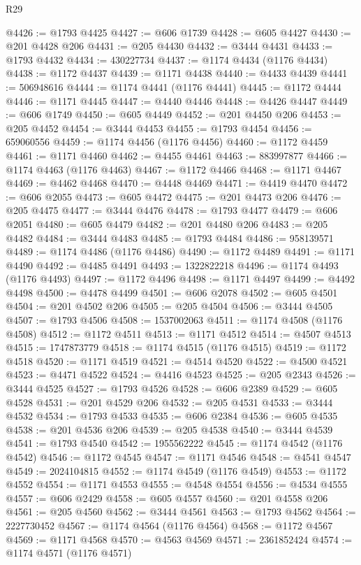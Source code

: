 \begin{lexlean}{R29}
\begin{coremodule}
@4426 := @1793 @4425
@4427 := @606 @1739
@4428 := @605 @4427
@4430 := @201 @4428 @206
@4431 := @205 @4430
@4432 := @3444 @4431
@4433 := @1793 @4432
@4434 := 430227734
@4437 := @1174 @4434 (@1176 @4434)
@4438 := @1172 @4437
@4439 := @1171 @4438
@4440 := @4433 @4439
@4441 := 506948616
@4444 := @1174 @4441 (@1176 @4441)
@4445 := @1172 @4444
@4446 := @1171 @4445
@4447 := @4440 @4446
@4448 := @4426 @4447
@4449 := @606 @1749
@4450 := @605 @4449
@4452 := @201 @4450 @206
@4453 := @205 @4452
@4454 := @3444 @4453
@4455 := @1793 @4454
@4456 := 659060556
@4459 := @1174 @4456 (@1176 @4456)
@4460 := @1172 @4459
@4461 := @1171 @4460
@4462 := @4455 @4461
@4463 := 883997877
@4466 := @1174 @4463 (@1176 @4463)
@4467 := @1172 @4466
@4468 := @1171 @4467
@4469 := @4462 @4468
@4470 := @4448 @4469
@4471 := @4419 @4470
@4472 := @606 @2055
@4473 := @605 @4472
@4475 := @201 @4473 @206
@4476 := @205 @4475
@4477 := @3444 @4476
@4478 := @1793 @4477
@4479 := @606 @2051
@4480 := @605 @4479
@4482 := @201 @4480 @206
@4483 := @205 @4482
@4484 := @3444 @4483
@4485 := @1793 @4484
@4486 := 958139571
@4489 := @1174 @4486 (@1176 @4486)
@4490 := @1172 @4489
@4491 := @1171 @4490
@4492 := @4485 @4491
@4493 := 1322822218
@4496 := @1174 @4493 (@1176 @4493)
@4497 := @1172 @4496
@4498 := @1171 @4497
@4499 := @4492 @4498
@4500 := @4478 @4499
@4501 := @606 @2078
@4502 := @605 @4501
@4504 := @201 @4502 @206
@4505 := @205 @4504
@4506 := @3444 @4505
@4507 := @1793 @4506
@4508 := 1537002063
@4511 := @1174 @4508 (@1176 @4508)
@4512 := @1172 @4511
@4513 := @1171 @4512
@4514 := @4507 @4513
@4515 := 1747873779
@4518 := @1174 @4515 (@1176 @4515)
@4519 := @1172 @4518
@4520 := @1171 @4519
@4521 := @4514 @4520
@4522 := @4500 @4521
@4523 := @4471 @4522
@4524 := @4416 @4523
@4525 := @205 @2343
@4526 := @3444 @4525
@4527 := @1793 @4526
@4528 := @606 @2389
@4529 := @605 @4528
@4531 := @201 @4529 @206
@4532 := @205 @4531
@4533 := @3444 @4532
@4534 := @1793 @4533
@4535 := @606 @2384
@4536 := @605 @4535
@4538 := @201 @4536 @206
@4539 := @205 @4538
@4540 := @3444 @4539
@4541 := @1793 @4540
@4542 := 1955562222
@4545 := @1174 @4542 (@1176 @4542)
@4546 := @1172 @4545
@4547 := @1171 @4546
@4548 := @4541 @4547
@4549 := 2024104815
@4552 := @1174 @4549 (@1176 @4549)
@4553 := @1172 @4552
@4554 := @1171 @4553
@4555 := @4548 @4554
@4556 := @4534 @4555
@4557 := @606 @2429
@4558 := @605 @4557
@4560 := @201 @4558 @206
@4561 := @205 @4560
@4562 := @3444 @4561
@4563 := @1793 @4562
@4564 := 2227730452
@4567 := @1174 @4564 (@1176 @4564)
@4568 := @1172 @4567
@4569 := @1171 @4568
@4570 := @4563 @4569
@4571 := 2361852424
@4574 := @1174 @4571 (@1176 @4571)

\end{coremodule}
\end{lexlean}

